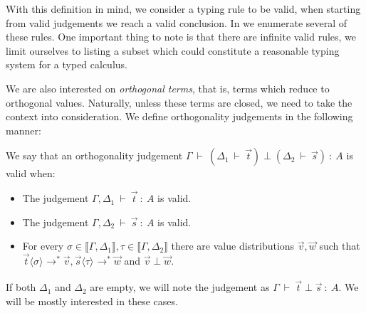 \documentclass[runningheads,orivec,envcountsame,envcountsect]{llncs}
\newcommand\lra{\longrightarrow}
\newcommand\ansubst[2]{\ensuremath{\langle #1 \rangle_{#2}}}
\def\eval{\lra^*}
\def\sem#1{\llbracket#1\rrbracket}
\def\TYP#1#2#3{#1~{\vdash}~#2~{:}~#3}
\def\SORTH#1#2#3#4{#1~{\vdash}~#2\perp#3~{:}~#4}
\def\ORTH#1#2#3#4#5#6{#1~{\vdash}~(#2~{\vdash}~#3)\perp(#4~{\vdash}~#5)~{:}~#6}
\begin{document}
With this definition in mind, we consider a typing rule to be valid, when starting from valid judgements we reach a valid conclusion. In  we enumerate several of these rules. One important thing to note is that there are infinite valid rules, we limit ourselves to listing a subset which could constitute a reasonable typing system for a typed calculus.

We are also interested on \emph{orthogonal terms}, that is, terms which reduce to orthogonal values. Naturally, unless these terms are closed, we need to take the context into consideration. We define orthogonality judgements in the following manner:

\begin{definition}
    We say that an orthogonality judgement $\ORTH{\Gamma}{\Delta_1}{\vec{t}}{\Delta_2}{\vec{s}}{A}$ is valid when:
    \begin{itemize}
        \item The judgement $\TYP{\Gamma,\Delta_1}{\vec{t}}{A}$ is valid.
        \item The judgement $\TYP{\Gamma,\Delta_2}{\vec{s}}{A}$ is valid.
        \item For every $\sigma\in\sem{\Gamma,\Delta_1}, \tau\in\sem{\Gamma,\Delta_2}$ there are value distributions $\vec{v},\vec{w}$ such that $\vec{t}\ansubst{\sigma}{}\eval\vec{v}, \vec{s}\ansubst{\tau}{}\eval\vec{w}$ and $\vec{v}\perp\vec{w}$.
    \end{itemize}
\end{definition}

If both $\Delta_1$ and $\Delta_2$ are empty, we will note the judgement as $\SORTH{\Gamma}{\vec{t}}{\vec{s}}{A}$. We will be mostly interested in these cases.
\end{document}

